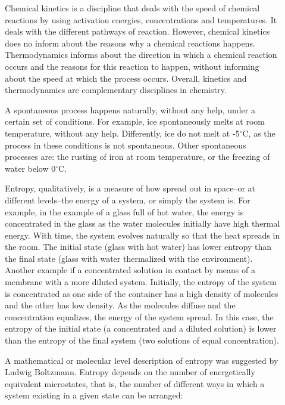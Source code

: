 \documentclass[main.tex]{subfiles}
\begin{document}
\begin{description}
\item[] Chemical kinetics is a discipline that deals with the speed of chemical reactions by using activation energies, concentrations and temperatures. It deals with the different pathways of reaction. However, chemical kinetics does no inform about the reasons why a chemical reactions happens. Thermodynamics informs about the direction in which a chemical reaction occurs and the reasons for this reaction to happen, without informing about the speed at which the process occurs. Overall, kinetics and thermodynamics are complementary disciplines in chemistry.

\item[] A spontaneous process happens naturally, without any help, under a certain set of conditions. For example, ice spontaneously melts at room temperature, without any help. Differently, ice do not melt at -5$^{\circ}$C, as the process in these conditions is not spontaneous. Other spontaneous processes are: the rusting of iron at room temperature, or the freezing of water below 0$^{\circ}$C.
\item[]
Entropy, qualitatively, is a measure of how spread out in space--or at different levels--the energy of a system, or simply the system is. For example, in the example of a glass full of hot water, the energy is concentrated in the glass as the water molecules initially have high thermal energy. With time, the system evolves naturally so that the heat spreads in the room. The initial state (glass with hot water) has lower entropy than the final state (glass with water thermalized with the environment). Another example if a concentrated solution in contact by means of a membrane with a more diluted system. Initially, the entropy of the system is concentrated as one side of the container has a high density of molecules and the other has low density. As the molecules diffuse and the concentration equalizes, the energy of the system spread. In this case, the entropy of the initial state (a concentrated and a diluted solution) is lower than the entropy of the final system (two solutions of equal concentration). 
\item[]
A mathematical or molecular level description of entropy was suggested by Ludwig Boltzmann. Entropy depends on the number of energetically equivalent microstates, that is, the number of different ways in which a system existing in a given state can be arranged:

\end{description}
\end{document}
